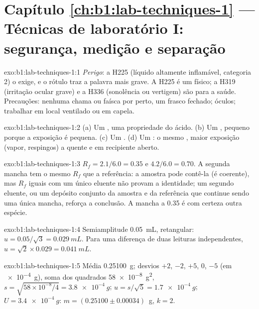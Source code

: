 \section*{Capítulo \ref{ch:b1:lab-techniques-1} --- Técnicas de laboratório I: segurança, medição e separação}

\begin{solution}{exo:b1:lab-techniques-1:1}
\emph{Perigo}: a H225 (líquido altamente inflamável, categoria 2) o exige,
e o rótulo traz a palavra mais grave. A H225 é um  físico; a H319
(irritação ocular grave) e a H336 (sonolência ou vertigem) são 
para a saúde. Precauções: nenhuma chama ou faísca por perto, um frasco
fechado; óculos; trabalhar em local ventilado ou em capela.
\end{solution}

\begin{solution}{exo:b1:lab-techniques-1:2}
(a) Um , uma propriedade do ácido. (b) Um , pequeno porque a
exposição é pequena. (c) Um . (d) Um : o mesmo , maior
exposição (vapor, respingos) a quente e em recipiente aberto.
\end{solution}

\begin{solution}{exo:b1:lab-techniques-1:3}
$R_f = 2.1/6.0 = 0.35$ e $4.2/6.0 = 0.70$. A segunda mancha tem o mesmo
$R_f$ que a referência: a amostra pode contê-la (é coerente), mas $R_f$
iguais com um único eluente não provam a identidade; um segundo eluente,
ou um depósito conjunto da amostra e da referência que continue sendo uma
única mancha, reforça a conclusão. A mancha a 0.35 é com certeza outra espécie.
\end{solution}

\begin{solution}{exo:b1:lab-techniques-1:4}
Semiamplitude \qty{0.05}{mL}, retangular: $u = 0.05/\sqrt3 = \qty{0.029}{mL}$.
Para uma diferença de duas leituras independentes,
$u = \sqrt{2} \times 0.029 = \qty{0.041}{mL}$.
\end{solution}

\begin{solution}{exo:b1:lab-techniques-1:5}
Média \qty{0.25100}{g}; desvios $+2$, $-2$, $+5$, 0, $-5$ (em
\qty{e-4}{g}), soma dos quadrados \qty{58e-8}{g^2}, $s = \sqrt{58 \times
10^{-8}/4} = \qty{3.8e-4}{g}$; $u = s/\sqrt5 = \qty{1.7e-4}{g}$;
$U = \qty{3.4e-4}{g}$: $m = (0.25100 \pm 0.00034)$~g, $k = 2$.
\end{solution}

